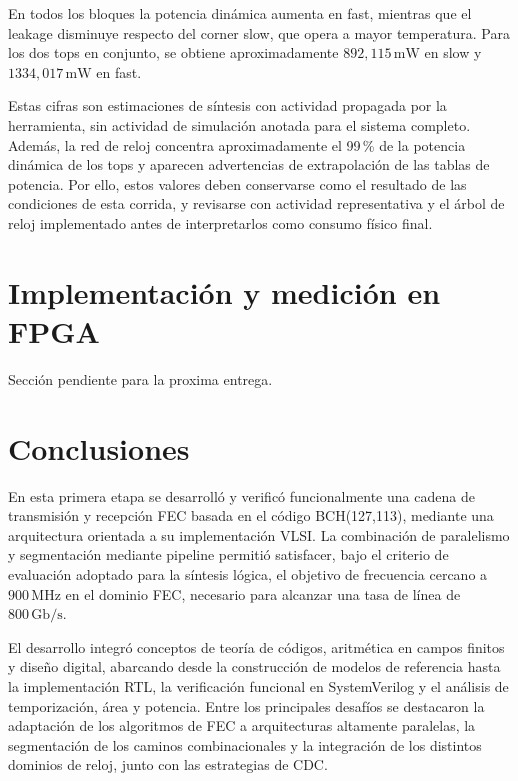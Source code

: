 \documentclass[10pt,a4paper]{article}
\begin{document}
En todos los bloques la potencia dinámica aumenta en fast, mientras que
el leakage disminuye respecto del corner slow, que opera a mayor
temperatura. Para los dos tops en conjunto, se obtiene
aproximadamente $892{,}115\,\mathrm{mW}$ en slow y
$1334{,}017\,\mathrm{mW}$ en fast.

Estas cifras son estimaciones de síntesis con actividad propagada por
la herramienta, sin actividad de simulación anotada para el sistema completo. Además, la red de reloj concentra
aproximadamente el 99\,\% de la potencia dinámica de los tops y aparecen
advertencias de extrapolación de las tablas de potencia. Por ello, estos
valores deben conservarse como el resultado de las condiciones de esta
corrida, y revisarse con actividad representativa y el árbol de reloj
implementado antes de interpretarlos como consumo físico final.


\section{Implementación y medición en FPGA}

Sección pendiente para la proxima entrega.

\section{Conclusiones}

En esta primera etapa se desarrolló y verificó funcionalmente una
cadena de transmisión y recepción FEC basada en el código
BCH(127,113), mediante una arquitectura orientada a su implementación
VLSI. La combinación de paralelismo y segmentación mediante
pipeline permitió satisfacer, bajo el criterio de evaluación
adoptado para la síntesis lógica, el objetivo de frecuencia
cercano a $900\,\mathrm{MHz}$ en el dominio FEC, necesario para
alcanzar una tasa de línea de $800\,\mathrm{Gb/s}$.

El desarrollo integró conceptos de teoría de códigos, aritmética
en campos finitos y diseño digital, abarcando desde la construcción
de modelos de referencia hasta la implementación RTL, la
verificación funcional en SystemVerilog y el análisis de
temporización, área y potencia. Entre los principales desafíos
se destacaron la adaptación de los algoritmos de FEC a arquitecturas
altamente paralelas, la segmentación de los caminos combinacionales
y la integración de los distintos dominios de reloj, junto con las
estrategias de CDC.
\end{document}

